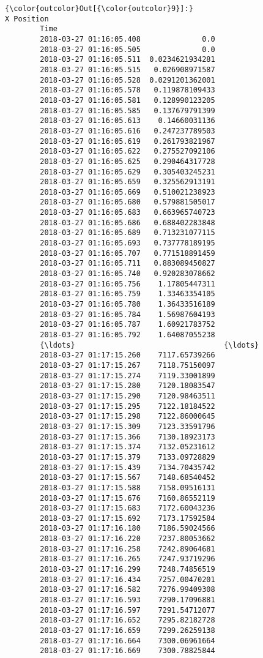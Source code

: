\documentclass[11pt]{article}
\begin{document}
\begin{Verbatim}[commandchars=\\\{\}]
{\color{outcolor}Out[{\color{outcolor}9}]:}                               X Position
        Time                                    
        2018-03-27 01:16:05.408              0.0
        2018-03-27 01:16:05.505              0.0
        2018-03-27 01:16:05.511  0.0234621934281
        2018-03-27 01:16:05.515   0.026908971587
        2018-03-27 01:16:05.528  0.0291201362001
        2018-03-27 01:16:05.578   0.119878109433
        2018-03-27 01:16:05.581   0.128990123205
        2018-03-27 01:16:05.585   0.137679791399
        2018-03-27 01:16:05.613    0.14660031136
        2018-03-27 01:16:05.616   0.247237789503
        2018-03-27 01:16:05.619   0.261793821967
        2018-03-27 01:16:05.622   0.275527092106
        2018-03-27 01:16:05.625   0.290464317728
        2018-03-27 01:16:05.629   0.305403245231
        2018-03-27 01:16:05.659   0.325562913191
        2018-03-27 01:16:05.669   0.510021238923
        2018-03-27 01:16:05.680   0.579881505017
        2018-03-27 01:16:05.683   0.663965740723
        2018-03-27 01:16:05.686   0.688402283848
        2018-03-27 01:16:05.689   0.713231077115
        2018-03-27 01:16:05.693   0.737778189195
        2018-03-27 01:16:05.707   0.771518891459
        2018-03-27 01:16:05.711   0.883089450827
        2018-03-27 01:16:05.740   0.920283078662
        2018-03-27 01:16:05.756    1.17805447311
        2018-03-27 01:16:05.759    1.33463354105
        2018-03-27 01:16:05.780    1.36433516189
        2018-03-27 01:16:05.784    1.56987604193
        2018-03-27 01:16:05.787    1.60921783752
        2018-03-27 01:16:05.792    1.64087055238
        {\ldots}                                  {\ldots}
        2018-03-27 01:17:15.260    7117.65739266
        2018-03-27 01:17:15.267    7118.75150097
        2018-03-27 01:17:15.274    7119.33001899
        2018-03-27 01:17:15.280    7120.18083547
        2018-03-27 01:17:15.290    7120.98463511
        2018-03-27 01:17:15.295    7122.18184522
        2018-03-27 01:17:15.298    7122.86000645
        2018-03-27 01:17:15.309    7123.33591796
        2018-03-27 01:17:15.366    7130.18923173
        2018-03-27 01:17:15.374    7132.05231612
        2018-03-27 01:17:15.379    7133.09728829
        2018-03-27 01:17:15.439    7134.70435742
        2018-03-27 01:17:15.567    7148.68540452
        2018-03-27 01:17:15.588    7158.09516131
        2018-03-27 01:17:15.676    7160.86552119
        2018-03-27 01:17:15.683    7172.60043236
        2018-03-27 01:17:15.692    7173.17592584
        2018-03-27 01:17:16.180    7186.59024566
        2018-03-27 01:17:16.220    7237.80053662
        2018-03-27 01:17:16.258    7242.89064681
        2018-03-27 01:17:16.265    7247.93719296
        2018-03-27 01:17:16.299    7248.74856519
        2018-03-27 01:17:16.434    7257.00470201
        2018-03-27 01:17:16.582    7276.99409308
        2018-03-27 01:17:16.593    7290.17096881
        2018-03-27 01:17:16.597    7291.54712077
        2018-03-27 01:17:16.652    7295.82182728
        2018-03-27 01:17:16.659    7299.26259138
        2018-03-27 01:17:16.664    7300.06961664
        2018-03-27 01:17:16.669    7300.78825844
        

\end{Verbatim}
\end{document}
